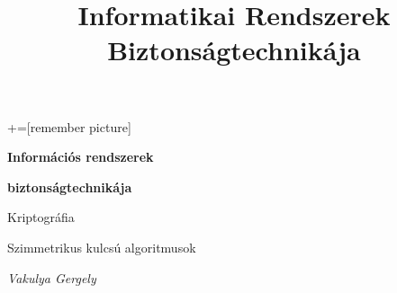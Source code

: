 \documentclass[12 pt]{beamer}
\author{}
\title{Informatikai Rendszerek Biztonságtechnikája}
\institute{}
\date{}
\newcommand{\titleimage}{title}			%
\begin{document}
+=[remember picture]

{

  \begin{frame}[c]
    \begin{center}

      \Large
      \textbf{Információs rendszerek}

      \textbf{biztonságtechnikája}

      \qquad

      Kriptográfia

      Szimmetrikus kulcsú algoritmusok

      \qquad

      \textit{Vakulya Gergely}







\end{center}
\end{frame}}
\end{document}
